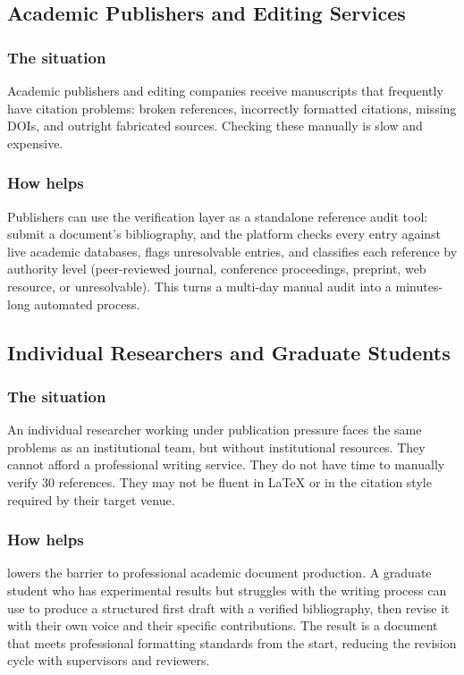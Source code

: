 \subsection{Academic Publishers and Editing Services}

\subsubsection*{The situation}

Academic publishers and editing companies receive manuscripts that frequently
have citation problems: broken references, incorrectly formatted citations,
missing DOIs, and outright fabricated sources.
Checking these manually is slow and expensive.

\subsubsection*{How \sys{} helps}

Publishers can use the \sys{} verification layer as a standalone reference
audit tool: submit a document's bibliography, and the platform checks every
entry against live academic databases, flags unresolvable entries, and
classifies each reference by authority level (peer-reviewed journal,
conference proceedings, preprint, web resource, or unresolvable).
This turns a multi-day manual audit into a minutes-long automated process.

\subsection{Individual Researchers and Graduate Students}

\subsubsection*{The situation}

An individual researcher working under publication pressure faces the same
problems as an institutional team, but without institutional resources.
They cannot afford a professional writing service.
They do not have time to manually verify 30 references.
They may not be fluent in \LaTeX{} or in the citation style required by their
target venue.

\subsubsection*{How \sys{} helps}

\sys{} lowers the barrier to professional academic document production.
A graduate student who has experimental results but struggles with the writing process
can use \sys{} to produce a structured first draft with a verified bibliography,
then revise it with their own voice and their specific contributions.
The result is a document that meets professional formatting standards from the start,
reducing the revision cycle with supervisors and reviewers.

